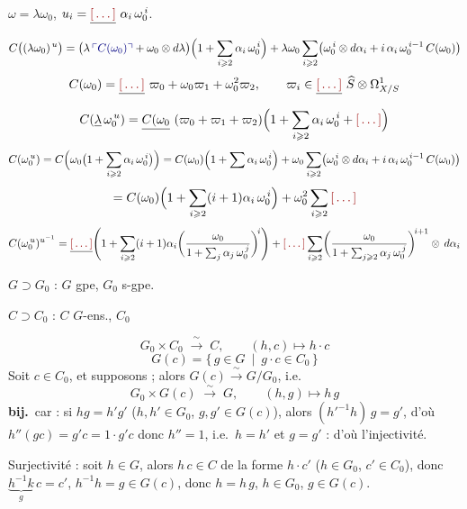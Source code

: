 \documentclass[11pt,a4paper]{article}
\begin{document}
$\omega = \lambda\omega_0$, \quad $u_i = \struck{\ill{}}\ \alpha_i\,\omega_0^{\,i}$.
\[
  C\bigl((\lambda\omega_0)^{\,u}\bigr) =
  \bigl(\lambda\,\add{C(\omega_0)} + \omega_0 \otimes d\lambda\bigr)
  \Bigl(1 + \sum_{i \geqslant 2}\alpha_i\,\omega_0^{\,i}\Bigr)
  + \lambda\omega_0 \sum_{i \geqslant 2}
  \bigl(\omega_0^{\,i} \otimes d\alpha_i + i\,\alpha_i\,\omega_0^{\,i-1}\,C(\omega_0)\bigr)
\]
\[
  C(\omega_0) = \struck{\ill{}}\ \varpi_0 + \omega_0\varpi_1 + \omega_0^2\varpi_2,
  \qquad \varpi_i \in \struck{\ill{}}\ \widehat{S} \otimes \Omega^1_{X/S}
\]
\[
  C(\struck{\lambda}\,\omega_0^{\,u}) = \struck{C(\omega_0}\ (\varpi_0 + \varpi_1 + \varpi_2)
  \Bigl(1 + \sum_{i \geqslant 2}\alpha_i\,\omega_0^{\,i} + \ill{}\Bigr)
\]
\[
  C(\omega_0^{\,u}) = C\Bigl(\omega_0\bigl(1 + \sum_{i \geqslant 2}\alpha_i\,\omega_0^{\,i}\bigr)\Bigr)
  = C(\omega_0)\Bigl(1 + \sum \alpha_i\,\omega_0^{\,i}\Bigr)
  + \omega_0 \sum_{i \geqslant 2}\bigl(\omega_0^{\,i} \otimes d\alpha_i
  + i\,\alpha_i\,\omega_0^{\,i-1}\,C(\omega_0)\bigr)
\]
\[
  = C(\omega_0)\Bigl(1 + \sum_{i \geqslant 2}(i+1)\alpha_i\,\omega_0^{\,i}\Bigr)
  + \omega_0^2 \sum_{i \geqslant 2} \ill{}
\]
\[
  C(\omega_0^{\,u})^{u^{-1}} = \struck{\ill{}}
  \Biggl(1 + \sum_{i \geqslant 2}(i+1)\alpha_i
  \biggl(\frac{\omega_0}{1 + \sum_j \alpha_j\,\omega_0^{\,j}}\biggr)^{\!i}\Biggr)
  + \ill{} \sum_{i \geqslant 2}
  \biggl(\frac{\omega_0}{1 + \sum_{j \geqslant 2} \alpha_j\,\omega_0^{\,j}}\biggr)^{\!i+1}
  \otimes\, d\alpha_i
\]

$G \supset G_0$ : $G$ gpe, $G_0$ s-gpe.\ \struck{\ill{}}

$C \supset C_0$ : $C$ $G$-ens., $C_0$ 

\[
  G_0 \times C_0 \;\xrightarrow{\ \sim\ }\; C, \qquad (h,c) \longmapsto h\cdot c
\]
\[
  G(c) = \{\, g \in G \ \mid\ g\cdot c \in C_0 \,\}
\]
Soit $c \in C_0$, et supposons \ill{} ; alors $G(c) \xrightarrow{\ \sim\ } G/G_0$,
i.e.\ \struck{\ill{}}
\[
  G_0 \times G(c) \;\xrightarrow{\ \sim\ }\; G, \qquad (h,g) \longmapsto h\,g
\]
\textbf{bij.}\ car : si $hg = h'g'$ ($h,h' \in G_0$, $g,g' \in G(c)$), alors
$(h'^{-1}h)\,g = g'$, d'où $h''(gc) = g'c = 1\cdot g'c$
donc $h'' = 1$, i.e.\ $h = h'$ et $g = g'$ : d'où l'injectivité.

Surjectivité : soit $h \in G$, alors $h\,c \in C$ de la forme $h\cdot c'$
($h \in G_0$, $c' \in C_0$), donc $\underbrace{h^{-1}k}_{g}\,c = c'$,
$h^{-1}h = g \in G(c)$, donc $h = h\,g$, $h \in G_0$, $g \in G(c)$.
\end{document}
